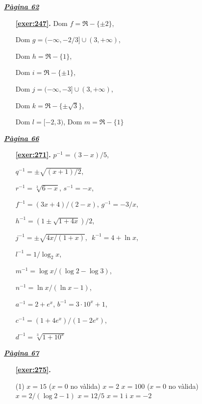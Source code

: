 
\hyperlink{page.62}{\textbf{\em Pàgina 62}}
\begin{enumerate}
\item[\fontfamily{phv}\selectfont\color{blue}\textbf{\ref{exer:247}. }] \label{ans:247} 
$\text {Dom }f=\Re -\{\pm 2\}$,\par $\text {Dom } g=(-\infty ,-2/3]\cup (3,+\infty )$,\par $\text {Dom } h=\Re -\{1\}$,\par $\text {Dom } i=\Re -\{\pm 1\}$,\par $\text {Dom } j=(-\infty ,-3]\cup (3,+\infty )$,\par $\text {Dom } k=\Re -\{\pm \sqrt {3}\}$,\par $\text {Dom } l=[-2,3)$, $\text {Dom } m=\Re - \{1\}$
 \end{enumerate}
\vspace{0.3cm}


\hyperlink{page.66}{\textbf{\em Pàgina 66}}
\begin{enumerate}
\item[\fontfamily{phv}\selectfont\color{blue}\textbf{\ref{exer:271}. }] \label{ans:271} 
$p^{-1}=(3-x)/5$,\par $q^{-1}=\pm \sqrt {(x+1)/2}$,\par $r^{-1}=\sqrt [3]{6-x}$, $s^{-1}=-x$,\par $f^{-1}=(3x+4)/(2-x)$, $g^{-1}=-3/x$,\par $h^{-1}=(1\pm \sqrt {1+4x})/2$,\par $j^{-1}=\pm \sqrt {4x/(1+x)}$, \,\,$k^{-1}=4+\ln x$,\par $l^{-1}=1/\log _2 {x}$,\par $m^{-1}=\log x /(\log 2 - \log 3)$,\par $n^{-1}=\ln x / (\ln x -1)$,\par $a^{-1}=2+e^x$, $b^{-1}=3\cdot 10^x +1$,\par $c^{-1}=(1+4 e^x)/(1-2 e^x)$,\par $d^{-1}=\sqrt [3]{1+10^x}$ 
 \end{enumerate}
\vspace{0.3cm}


\hyperlink{page.67}{\textbf{\em Pàgina 67}}
\begin{enumerate}



 \item[\fontfamily{phv}\selectfont\color{blue}\textbf{\ref{exer:275}. }] \label{ans:275}
 \begin{tasks}[column-sep=1em, item-indent=1.3333em](1)
	 \task $x=15$ ($x=0$ no vàlida)
	 \task $x=2$
	 \task $x=100$ ($x=0$ no vàlida)
	 \task $x=2/(\log 2 - 1)$
	 \task $x=12/5$
	 \task $x=1$ i $x=-2$
\end{tasks}
 \end{enumerate}
\vspace{0.3cm}

